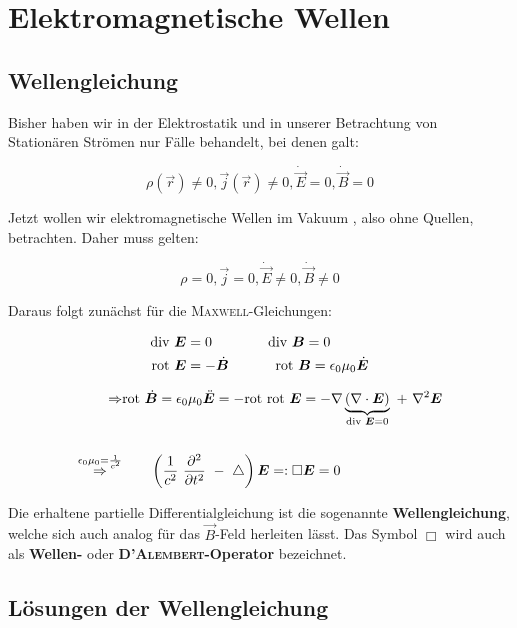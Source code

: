 \chapter{Elektromagnetische Wellen}

\section{Wellengleichung}

Bisher haben wir in der Elektrostatik und in unserer Betrachtung von Stationären Strömen nur Fälle behandelt, bei denen galt:

\begin{equation*}
\rho(\vec{r})\neq 0, \vec{j}(\vec{r})\neq 0, \dot{\vec{E}}=0, \dot{\vec{B}}=0
\end{equation*}

Jetzt wollen wir elektromagnetische Wellen im Vakuum , also ohne Quellen, betrachten. Daher muss gelten: 

\begin{equation*}
\rho=0, \vec{j}=0,\dot{\vec{E}}\neq 0,\dot{\vec{B}}\neq 0
\end{equation*}

Daraus folgt zunächst für die \textsc{Maxwell}-Gleichungen:

\begin{align*}
\text{div } \bm{E} &=0 \qquad \qquad\text{div } \bm{B} = 0\\
\text{rot }  \bm{E} &= -\dot{\bm{B}} \qquad\quad \ \text{rot } \bm{B} = \epsilon_0\mu_0 \dot{\bm{E}}\\
\end{align*}

\begin{align*}
\Rightarrow & \text{rot }\dot{\bm{B}} = \epsilon_0\mu_0\ddot{\bm{E}} = -\text{rot }\text{rot }\bm{E} = -\nabla\underbrace{(\nabla\cdot\bm{E})}_{\text{div }\bm{E}=0} \ + \ \nabla^2 \bm{E}\\
\ \\
\overset{\epsilon_0\mu_0 = \frac{1}{c^2}}{\Rightarrow} &\qquad \left(\frac{1}{c^2} \ \frac{\partial ^2{}}{\partial{t}^2} \ - \ \bigtriangleup\right)\bm{E} =: \Box\bm{E} = 0
\end{align*}

Die erhaltene partielle Differentialgleichung ist die sogenannte \textbf{Wellengleichung}, welche sich auch analog für das $\vec{B}$-Feld herleiten lässt. Das Symbol $\Box$ wird auch als \textbf{Wellen-} oder \textbf{\textsc{D'Alembert}-Operator} bezeichnet.


\section{Lösungen der Wellengleichung}

